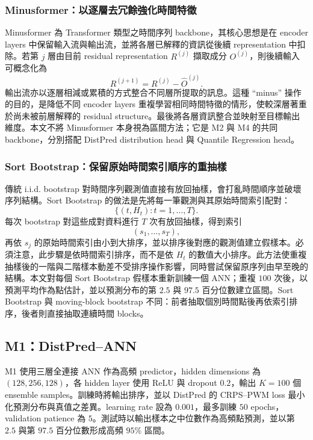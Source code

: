 \subsubsection{Minusformer：以逐層去冗餘強化時間特徵}

Minusformer 為 Transformer 類型之時間序列 backbone，其核心思想是在 encoder layers 中保留輸入流與輸出流，並將各層已解釋的資訊從後續 representation 中扣除。若第 $j$ 層由目前 residual representation $R^{(j)}$ 擷取成分 $O^{(j)}$，則後續輸入可概念化為
\[
    R^{(j+1)}=R^{(j)}-\widehat O^{(j)}.
\]
輸出流亦以逐層相減或累積的方式整合不同層所提取的訊息。這種 ``minus'' 操作的目的，是降低不同 encoder layers 重複學習相同時間特徵的情形，使較深層著重於尚未被前層解釋的 residual structure。最後將各層資訊整合並映射至目標輸出維度。本文不將 Minusformer 本身視為區間方法；它是 M2 與 M4 的共同 backbone，分別搭配 DistPred distribution head 與 Quantile Regression head。

\subsubsection{Sort Bootstrap：保留原始時間索引順序的重抽樣}

傳統 i.i.d. bootstrap 對時間序列觀測值直接有放回抽樣，會打亂時間順序並破壞序列結構。Sort Bootstrap 的做法是先將每一筆觀測與其原始時間索引配對：
\[
    \{(t,H_t):t=1,\ldots,T\}.
\]
每次 bootstrap 對這些成對資料進行 $T$ 次有放回抽樣，得到索引
\[
    (s_1,\ldots,s_T),
\]
再依 $s_j$ 的原始時間索引由小到大排序，並以排序後對應的觀測值建立假樣本。必須注意，此步驟是依時間索引排序，而不是依 $H_t$ 的數值大小排序。此方法使重複抽樣後的一階與二階樣本動差不受排序操作影響，同時嘗試保留原序列由早至晚的結構。本文對每個 Sort Bootstrap 假樣本重新訓練一個 ANN；重複 $100$ 次後，以預測平均作為點估計，並以預測分布的第 $2.5$ 與 $97.5$ 百分位數建立區間。Sort Bootstrap 與 moving-block bootstrap 不同：前者抽取個別時間點後再依索引排序，後者則直接抽取連續時間 blocks。

\subsection{M1：DistPred--ANN}
\label{subsec:m1-method}

M1 使用三層全連接 ANN 作為高頻 predictor，hidden dimensions 為 $(128,256,128)$，各 hidden layer 使用 ReLU 與 dropout $0.2$，輸出 $K=100$ 個 ensemble samples。訓練時將輸出排序，並以 DistPred 的 CRPS--PWM loss 最小化預測分布與真值之差異。learning rate 設為 $0.001$，最多訓練 $50$ epochs，validation patience 為 $5$。測試時以輸出樣本之中位數作為高頻點預測，並以第 $2.5$ 與第 $97.5$ 百分位數形成高頻 $95\%$ 區間。

